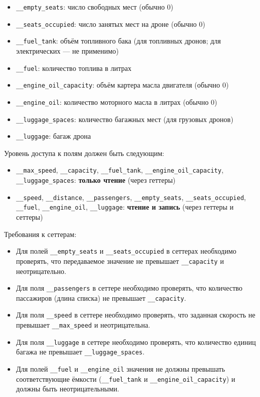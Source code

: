 \begin{enumerate}
\begin{itemize}
    \item \texttt{\_\_empty\_seats}: число свободных мест (обычно 0)  
    \item \texttt{\_\_seats\_occupied}: число занятых мест на дроне (обычно 0)  
    \item \texttt{\_\_fuel\_tank}: объём топливного бака (для топливных дронов; для электрических — не применимо)  
    \item \texttt{\_\_fuel}: количество топлива в литрах  
    \item \texttt{\_\_engine\_oil\_capacity}: объём картера масла двигателя (обычно 0)  
    \item \texttt{\_\_engine\_oil}: количество моторного масла в литрах (обычно 0)  
    \item \texttt{\_\_luggage\_spaces}: количество багажных мест (для грузовых дронов)  
    \item \texttt{\_\_luggage}: багаж дрона  
\end{itemize}
Уровень доступа к полям должен быть следующим:
\begin{itemize}
    \item \texttt{\_\_max\_speed}, \texttt{\_\_capacity}, \texttt{\_\_fuel\_tank}, \texttt{\_\_engine\_oil\_capacity}, \texttt{\_\_luggage\_spaces}: \textbf{только чтение} (через геттеры)  
    \item \texttt{\_\_speed}, \texttt{\_\_distance}, \texttt{\_\_passengers}, \texttt{\_\_empty\_seats}, \texttt{\_\_seats\_occupied}, \texttt{\_\_fuel}, \texttt{\_\_engine\_oil}, \texttt{\_\_luggage}: \textbf{чтение и запись} (через геттеры и сеттеры)
\end{itemize}
Требования к сеттерам:
\begin{itemize}
    \item Для полей \texttt{\_\_empty\_seats} и \texttt{\_\_seats\_occupied} в сеттерах необходимо проверять, что передаваемое значение не превышает \texttt{\_\_capacity} и неотрицательно.  
    \item Для поля \texttt{\_\_passengers} в сеттере необходимо проверять, что количество пассажиров (длина списка) не превышает \texttt{\_\_capacity}.  
    \item Для поля \texttt{\_\_speed} в сеттере необходимо проверять, что заданная скорость не превышает \texttt{\_\_max\_speed} и неотрицательна.  
    \item Для поля \texttt{\_\_luggage} в сеттере необходимо проверять, что количество единиц багажа не превышает \texttt{\_\_luggage\_spaces}.
    \item Для полей \texttt{\_\_fuel} и \texttt{\_\_engine\_oil} значения не должны превышать соответствующие ёмкости (\texttt{\_\_fuel\_tank} и \texttt{\_\_engine\_oil\_capacity}) и должны быть неотрицательными.

\end{itemize}
\end{enumerate}
